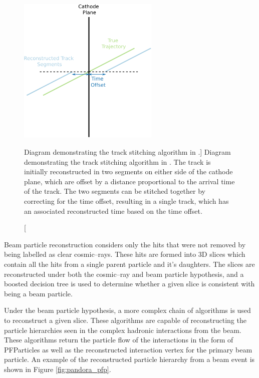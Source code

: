 \begin{figure}
	\centering
	\includegraphics[width=0.6\textwidth]{figures/track_stitch.pdf}
	\caption
	[Diagram demonstrating the track stitching algorithm in \protodune{}.]
	{Diagram demonstrating the track stitching algorithm in \protodune{}. The
	track is initially reconstructed in two segments on either side of the cathode
	plane, which are offset by a distance proportional to the arrival time of the
	track. The two segments can be stitched together by correcting for the time
	offset, resulting in a single track, which has an associated reconstructed
	time based on the time offset.}
	\label{fig:track_stitching}
\end{figure}

Beam particle reconstruction considers only the hits that were not removed by 
being labelled as clear cosmic--rays. These hits are formed into 3D slices which
contain all the hits from a single parent particle and it's daughters. The
slices are reconstructed under both the cosmic--ray and beam particle
hypothesis, and a boosted decision tree is used to determine whether a 
given slice is consistent with being a beam particle\cite{protoduneperf}. 

Under the beam particle hypothesis, a more complex chain of algorithms is used 
to reconstruct a given slice. These algorithms are capable of reconstructing 
the particle hierarchies seen in the complex hadronic interactions from the 
\protodune{} beam. These algorithms return the particle flow of the 
interactions in the form of PFParticles as well as the reconstructed 
interaction vertex for the primary beam particle. An example of the 
reconstructed particle hierarchy from a \protodune{} beam event is shown in 
Figure \ref{fig:pandora_pfp}.


